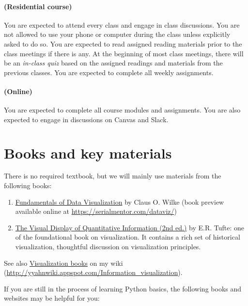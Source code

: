 \documentclass[11pt,article,oneside]{memoir} %
\begin{document}
\paragraph{(Residential course)} You are expected to attend every class and engage in class discussions. 
You are not allowed to use your phone or computer during the class unless explicitly asked to do so.  
You are expected to read assigned reading materials prior to the class meetings if there is any.
At the beginning of most class meetings, there will be an \emph{in-class quiz} based on the assigned readings and materials from the previous classes. 
You are expected to complete all weekly assignments. 

\paragraph{(Online)} You are expected to complete all course modules and assignments. 
You are also expected to engage in discussions on Canvas and Slack. 

\section{Books and key materials}%

There is no required textbook, but we will mainly use materials from the following books:

\begin{enumerate}
    
\item \href{https://serialmentor.com/dataviz/}{Fundamentals of Data Visualization} by Claus O. Wilke (book preview available online at \url{https://serialmentor.com/dataviz/})

\item \href{http://www.amazon.com/gp/product/0961392142}{The Visual Display of Quantitative Information (2nd ed.)} by E.R. Tufte: one of the foundational book on visualization. It contains a rich set of historical visualization, thoughtful discussion on visualization principles. 

\end{enumerate}

See also \href{http://yyahnwiki.appspot.com/Information_visualization#h_6225eb5bf8a031f750a1b03f810ccc6a}{Visualization books} on my wiki (\url{http://yyahnwiki.appspot.com/Information_visualization}). 


If you are still in the process of learning Python basics, the following books and websites may be helpful for you:
\end{document}
